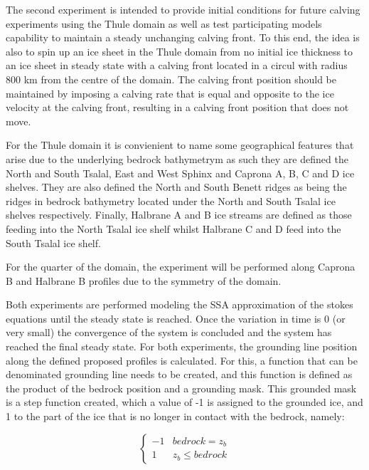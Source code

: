 \documentclass{article}
\begin{document}
The second experiment is intended to provide initial conditions for future calving experiments using the Thule domain as well as test participating models capability to maintain a steady unchanging calving front. To this end, the idea is also to spin up an ice sheet in the Thule domain from no initial ice thickness to an ice sheet in steady state with a calving front located in a circul with radius 800 km from the centre of the domain. The calving front position should be maintained by imposing a calving rate that is equal and opposite to the ice velocity at the calving front, resulting in a calving front position that does not move. 

For the Thule domain it is convienient to name some geographical features that arise due to the underlying bedrock bathymetrym as such they are defined the North and South Tsalal, East and West Sphinx and Caprona A, B, C and D ice shelves. They are also defined the North and South Benett ridges as being the ridges in bedrock bathymetry located under the North and South Tsalal ice shelves respectively. Finally,  Halbrane A and B ice streams are defined as those feeding into the North Tsalal ice shelf whilst Halbrane C and D feed into the South Tsalal ice shelf.

For the quarter of the domain, the experiment will be performed along Caprona B and Halbrane B profiles due to the symmetry of the domain.

Both experiments are performed modeling the SSA approximation of the stokes equations until the steady state is reached. Once the variation in time is 0 (or very small) the convergence of the system is concluded and the system has reached the final steady state. For both experiments, the grounding line position along the defined proposed profiles is calculated. For this, a function that can be denominated grounding line needs to be created, and this function is defined as the product of the bedrock position and a grounding mask. This grounded mask is a step function created, which a value of -1 is assigned to the grounded ice, and 1 to the part of the ice that is no longer in contact with the bedrock, namely:

\[ \begin{cases} 
	-1 & bedrock = z_b \\
	1 & z_b \leq bedrock   
\end{cases}
\]
\end{document}

